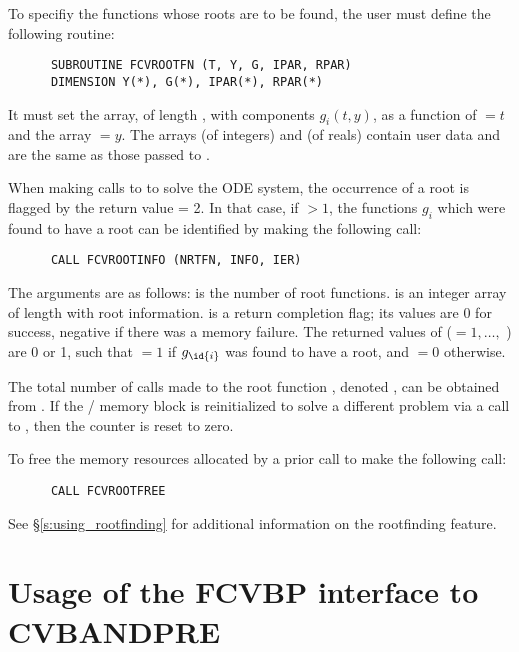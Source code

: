 To specifiy the functions whose roots are to be found, the user must
define the following routine:
\begin{verbatim}
      SUBROUTINE FCVROOTFN (T, Y, G, IPAR, RPAR)
      DIMENSION Y(*), G(*), IPAR(*), RPAR(*)
\end{verbatim}
It must set the  array, of length , with components $g_i(t,y)$,
as a function of  $= t$ and the array  $= y$.  
The arrays  (of integers) and  (of reals) contain user data
and are the same as those passed to .

When making calls to  to solve the ODE system, the occurrence of
a root is flagged by the return value  = 2.  In that case, if
 $> 1$, the functions $g_i$ which were found to have a root can
be identified by making the following call:
\begin{verbatim}
      CALL FCVROOTINFO (NRTFN, INFO, IER)
\end{verbatim}
The arguments are as follows:  is the number of root functions.
 is an integer array of length  with root information.
 is a return completion flag; its values are $0$ for success, 
negative if there was a memory failure.  The returned values of 
($ = 1,\ldots,$ ) are 0 or 1, such that  $ = 1$
if $g_{\id{i}}$ was found to have a root, and  $ = 0$ otherwise.

The total number of calls made to the root function ,
denoted , can be obtained from .
If the {\fcvode}/{\cvode} memory block is reinitialized to solve a
different problem via a call to , then the counter
 is reset to zero.

To free the memory resources allocated by a prior call to  make
the following call:
\begin{verbatim}
      CALL FCVROOTFREE
\end{verbatim}
See \S\ref{s:using_rootfinding} for additional information on the
rootfinding feature.


\section{Usage of the FCVBP interface to CVBANDPRE}

